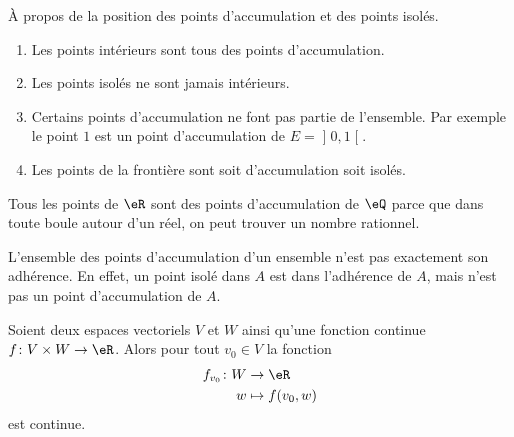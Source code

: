 \begin{remark}
    À propos de la position des points d'accumulation et des points isolés.
    \begin{enumerate}
        \item
            Les points intérieurs sont tous des points d'accumulation.
        \item
            Les points isolés ne sont jamais intérieurs.
        \item
            Certains points d'accumulation ne font pas partie de l'ensemble. Par exemple le point $1$ est un point d'accumulation de $E=\mathopen] 0 , 1 \mathclose[$.
        \item
            Les points de la frontière sont soit d'accumulation soit isolés.
    \end{enumerate}
\end{remark}


\begin{example}
	Tous les points de $\eR$ sont des points d'accumulation de $\eQ$ parce que dans toute boule autour d'un réel, on peut trouver un nombre rationnel.
\end{example}

\begin{remark}
	L'ensemble des points d'accumulation d'un ensemble n'est pas exactement son adhérence. En effet, un point isolé dans $A$ est dans l'adhérence de $A$, mais n'est pas un point d'accumulation de $A$.
\end{remark}

\begin{lemma}       \label{LEMooHAODooYSPmvH}
    Soient deux espaces vectoriels \( V\) et \( W\) ainsi qu'une fonction continue \( f\colon V\times W\to \eR\). Alors pour tout \( v_0\in V\) la fonction 
    \begin{equation}
        \begin{aligned}
            f_{v_0}\colon W&\to \eR \\
            w&\mapsto f(v_0,w) 
        \end{aligned}
    \end{equation}
    est continue.    
\end{lemma}

